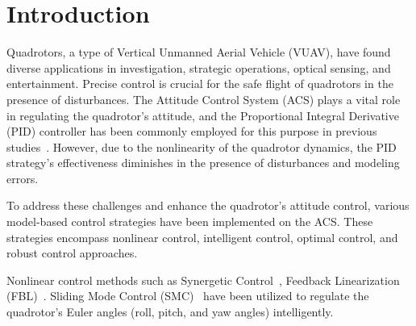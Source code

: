 \documentclass[3p]{elsarticle}
\begin{document}
\section{Introduction}\label{sec:intro}

\noindent Quadrotors, a type of Vertical Unmanned Aerial Vehicle (VUAV), have found diverse applications in investigation, strategic operations, optical sensing, and entertainment. Precise control is crucial for the safe flight of quadrotors in the presence of disturbances. The Attitude Control System (ACS) plays a vital role in regulating the quadrotor's attitude, and the Proportional Integral Derivative (PID) controller has been commonly employed for this purpose in previous studies~\cite{article_Abdul, article_Bolandi}. However, due to the nonlinearity of the quadrotor dynamics, the PID strategy's effectiveness diminishes in the presence of disturbances and modeling errors.

To address these challenges and enhance the quadrotor's attitude control, various model-based control strategies have been implemented on the ACS. These strategies encompass nonlinear control, intelligent control, optimal control, and robust control approaches.

Nonlinear control methods such as Synergetic Control~\cite{article_Chara}, Feedback Linearization (FBL)~\cite{article_Aboudonia}. Sliding Mode Control (SMC)~\cite{LABBADI2020290, WU2022436, MOFID2022455, CHEN2022114, SRINIVASARAO2022516, ZHOU202185} have been utilized to regulate the quadrotor's Euler angles (roll, pitch, and yaw angles) intelligently.
\end{document}
